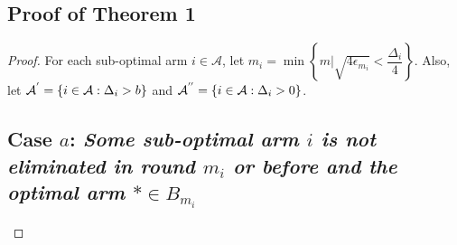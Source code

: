 \subsection*{Proof of Theorem 1}
\label{sec:proofTheorem:Theorem1}
\begin{proof}
For each sub-optimal arm ${i}\in\mathcal{A}$, let $m_{i}=\min{\left\lbrace m|\sqrt{4\epsilon_{m_i}} < \dfrac{\Delta_{i}}{4}\right\rbrace}$. Also, let $\mathcal{A}^{'}=\lbrace i\in \mathcal{A}: \Delta_{i} > b \rbrace$ and $\mathcal{A}^{''}=\lbrace i\in \mathcal{A}: \Delta_{i} > 0 \rbrace$. 

\subsection*{Case $a$: \textit{Some sub-optimal arm ${i}$ is not eliminated in round $m_{i}$ or before and the optimal arm ${*}\in B_{m_{i}}$}}


\end{proof}
